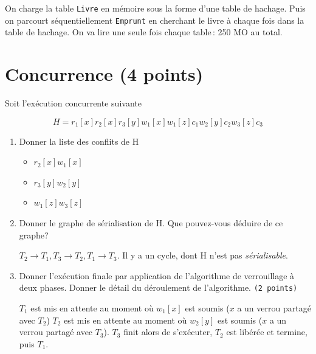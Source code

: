 \begin{enumerate}
\begin{solution}
On charge la table \texttt{Livre} en mémoire sous la forme d'une table de hachage.
Puis on parcourt séquentiellement \texttt{Emprunt} en cherchant le livre 
à chaque fois dans la table de hachage. On va lire une seule fois chaque table\,: 250 MO au total.
\end{solution}
\end{enumerate}


\section{Concurrence (4 points)}

Soit l'exécution concurrente suivante

$$H = r_1[x] r_2[x] r_3[y] w_1[x] w_1[z] c_1 w_2[y] c_2 w_3[z] c_3$$

\begin{enumerate}

\item Donner la liste des conflits de H
\begin{solution}
    \begin{itemize}
        \item[sur x : ] $r_2[x] w_1[x]$
        \item[sur y : ] $r_3[y] w_2[y]$
        \item[sur z : ] $w_1[z] w_3[z]$
    \end{itemize}
\end{solution}

\item Donner le graphe de s\'erialisation de H. Que pouvez-vous déduire de ce
graphe? 
\begin{solution}
    $T_2 \rightarrow T_1, T_3 \rightarrow T_2, T_1 \rightarrow T_3$. Il y a un cycle, dont H n'est pas \textit{s\'erialisable}.
\end{solution}


\item Donner l'exécution finale par application de l'algorithme de verrouillage à deux phases. 
Donner le détail du déroulement de l'algorithme.
 \texttt{(2 points)}

\begin{solution}
$T_1$  est mis en attente au moment où $w_1[x]$ est soumis ($x$ a un  verrou partagé avec $T_2$)
$T_2$  est mis en attente au moment où $w_2[y]$ est soumis ($x$ a un  verrou partagé avec $T_3$). 
$T_3$ finit alors de s'exécuter, $T_2$ est libérée et termine, puis $T_1$.
\end{solution}


\end{enumerate}
